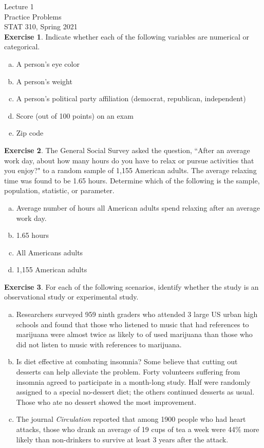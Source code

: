\documentclass[11pt, fleqn]{article}
\begin{document}
\setlength\parindent{0pt}
Lecture 1\\
Practice Problems\\
STAT 310, Spring 2021\\

\textbf{Exercise 1}.  Indicate whether each of the following variables are numerical or categorical.
\begin{enumerate}[(a)]
\item A person's eye color
\item A person's weight
\item A person's political party affiliation (democrat, republican, independent)
\item Score (out of 100 points) on an exam
\item Zip code\\
\end{enumerate} 

\textbf{Exercise 2}. The General Social Survey asked the question, ``After an average work day, about how many hours do you have to relax or pursue activities that you enjoy?" to a random sample of 1,155 American adults. The average relaxing time was found to be 1.65 hours. Determine which of the following is the sample, population, statistic, or parameter.
\begin{enumerate}[(a)]
\item Average number of hours all American adults spend relaxing after an average 
work day.
\item 1.65 hours
\item All Americans adults
\item 1,155 American adults\\
\end{enumerate}

\textbf{Exercise 3}.  For each of the following scenarios, identify whether the study is an observational study or experimental study.   
\begin{enumerate}[(a)]
\item Researchers surveyed 959 ninth graders who attended 3 large US urban high schools and found that those who listened to music that had references to marijuana were almost twice as likely to of used marijuana than those who did not listen to music with references to marijuana.   
\item Is diet effective at combating insomnia?  Some believe that cutting out desserts can help alleviate the problem.  Forty volunteers suffering from insomnia agreed to participate in a month-long study.  Half were randomly assigned to a special no-dessert diet; the others continued desserts as usual.  Those who ate no dessert showed the most improvement. 
\item The journal \emph{Circulation} reported that among 1900 people who had heart attacks, those who drank an average of 19 cups of tea a week were 44\% more likely than non-drinkers to survive at least 3 years after the attack.
\end{enumerate} 
\end{document}
